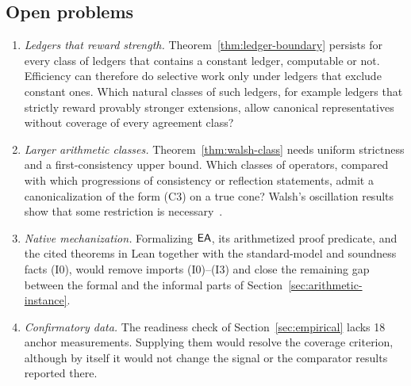 \subsection{Open problems}

\begin{enumerate}
\item \emph{Ledgers that reward strength.} Theorem~\ref{thm:ledger-boundary} persists for every class of ledgers that contains a constant ledger, computable or not. Efficiency can therefore do selective work only under ledgers that exclude constant ones. Which natural classes of such ledgers, for example ledgers that strictly reward provably stronger extensions, allow canonical representatives without coverage of every agreement class?
\item \emph{Larger arithmetic classes.} Theorem~\ref{thm:walsh-class} needs uniform strictness and a first-consistency upper bound. Which classes of operators, compared with which progressions of consistency or reflection statements, admit a canonicalization of the form (C3) on a true cone? Walsh's oscillation results show that some restriction is necessary~\cite{Walsh2022Evitable}.
\item \emph{Native mechanization.} Formalizing $\mathsf{EA}$, its arithmetized proof predicate, and the cited theorems in Lean together with the standard-model and soundness facts (I0), would remove imports (I0)--(I3) and close the remaining gap between the formal and the informal parts of Section~\ref{sec:arithmetic-instance}.
\item \emph{Confirmatory data.} The readiness check of Section~\ref{sec:empirical} lacks 18 anchor measurements. Supplying them would resolve the coverage criterion, although by itself it would not change the signal or the comparator results reported there.
\end{enumerate}
